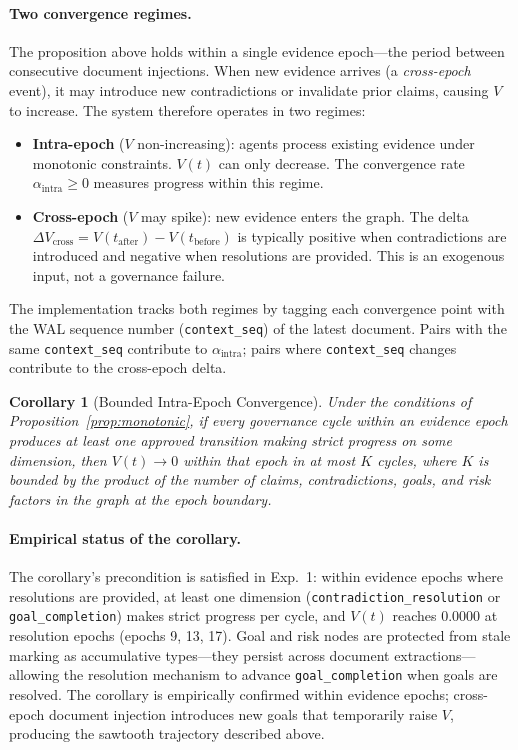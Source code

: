 \documentclass[11pt]{article}
\newtheorem{corollary}{Corollary}
\begin{document}
\paragraph{Two convergence regimes.} The proposition above holds within a single evidence epoch---the period between consecutive document injections. When new evidence arrives (a \emph{cross-epoch} event), it may introduce new contradictions or invalidate prior claims, causing $V$ to increase. The system therefore operates in two regimes:

\begin{itemize}
  \item \textbf{Intra-epoch} ($V$ non-increasing): agents process existing evidence under monotonic constraints. $V(t)$ can only decrease. The convergence rate $\alpha_{\text{intra}} \geq 0$ measures progress within this regime.
  \item \textbf{Cross-epoch} ($V$ may spike): new evidence enters the graph. The delta $\Delta V_{\text{cross}} = V(t_{\text{after}}) - V(t_{\text{before}})$ is typically positive when contradictions are introduced and negative when resolutions are provided. This is an exogenous input, not a governance failure.
\end{itemize}

The implementation tracks both regimes by tagging each convergence point with the WAL sequence number (\texttt{context\_seq}) of the latest document. Pairs with the same \texttt{context\_seq} contribute to $\alpha_{\text{intra}}$; pairs where \texttt{context\_seq} changes contribute to the cross-epoch delta.

\begin{corollary}[Bounded Intra-Epoch Convergence]
Under the conditions of Proposition~\ref{prop:monotonic}, if every governance cycle within an evidence epoch produces at least one approved transition making strict progress on some dimension, then $V(t) \to 0$ within that epoch in at most $K$ cycles, where $K$ is bounded by the product of the number of claims, contradictions, goals, and risk factors in the graph at the epoch boundary.
\end{corollary}

\paragraph{Empirical status of the corollary.} The corollary's precondition is satisfied in Exp.~1: within evidence epochs where resolutions are provided, at least one dimension (\texttt{contradiction\_resolution} or \texttt{goal\_completion}) makes strict progress per cycle, and $V(t)$ reaches 0.0000 at resolution epochs (epochs 9, 13, 17). Goal and risk nodes are protected from stale marking as accumulative types---they persist across document extractions---allowing the resolution mechanism to advance \texttt{goal\_completion} when goals are resolved. The corollary is empirically confirmed within evidence epochs; cross-epoch document injection introduces new goals that temporarily raise $V$, producing the sawtooth trajectory described above.
\end{document}

